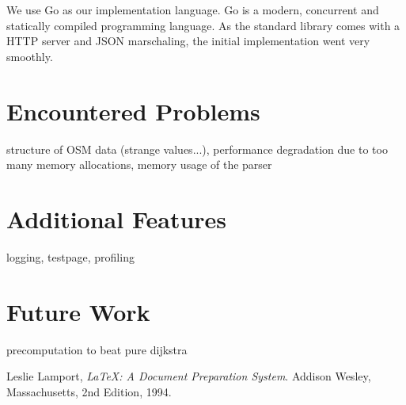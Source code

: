 \documentclass[a4paper]{article}
\begin{document}
We use Go as our implementation language.
Go is a modern, concurrent and statically compiled programming language.
As the standard library comes with a HTTP server and JSON marschaling,
the initial implementation went very smoothly.

\section{Encountered Problems}
structure of OSM data (strange values...),
performance degradation due to too many memory allocations,
memory usage of the parser

\section{Additional Features}
logging,
testpage,
profiling

\section{Future Work}
precomputation to beat pure dijkstra

\begin{thebibliography}{9}

  Leslie Lamport,
  \emph{\LaTeX: A Document Preparation System}.
  Addison Wesley, Massachusetts,
  2nd Edition,
  1994.

\end{thebibliography}
\end{document}
